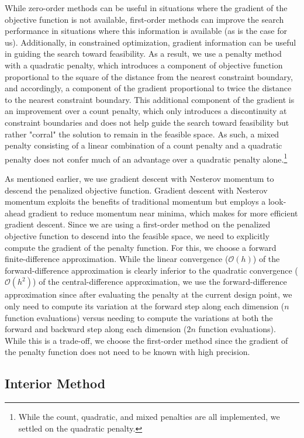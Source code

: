 \documentclass[conference]{IEEEtran}
\begin{document}
While zero-order methods can be useful in situations where the gradient of the objective function is not available, first-order methods can improve the search performance in situations where this information is available (as is the case for us). Additionally, in constrained optimization, gradient information can be useful in guiding the search toward feasibility. As a result, we use a penalty method with a quadratic penalty, which introduces a component of objective function proportional to the square of the distance from the nearest constraint boundary, and accordingly, a component of the gradient proportional to twice the distance to the nearest constraint boundary. This additional component of the gradient is an improvement over a count penalty, which only introduces a discontinuity at constraint boundaries and does not help guide the search toward feasibility but rather "corral" the solution to remain in the feasible space. As such, a mixed penalty consisting of a linear combination of a count penalty and a quadratic penalty does not confer much of an advantage over a quadratic penalty alone.\footnote{While the count, quadratic, and mixed penalties are all implemented, we settled on the quadratic penalty.}

As mentioned earlier, we use gradient descent with Nesterov momentum to descend the penalized objective function. Gradient descent with Nesterov momentum exploits the benefits of traditional momentum but employs a look-ahead gradient to reduce momentum near minima, which makes for more efficient gradient descent. Since we are using a first-order method on the penalized objective function to descend into the feasible space, we need to explicitly compute the gradient of the penalty function. For this, we choose a forward finite-difference approximation. While the linear convergence ($\mathcal{O}(h)$) of the forward-difference approximation is clearly inferior to the quadratic convergence ($\mathcal{O}(h^2)$) of the central-difference approximation, we use the forward-difference approximation since after evaluating the penalty at the current design point, we only need to compute its variation at the forward step along each dimension ($n$ function evaluations) versus needing to compute the variations at both the forward and backward step along each dimension ($2n$ function evaluations). While this is a trade-off, we choose the first-order method since the gradient of the penalty function does not need to be known with high precision.

\subsection{Interior Method}
\end{document}
